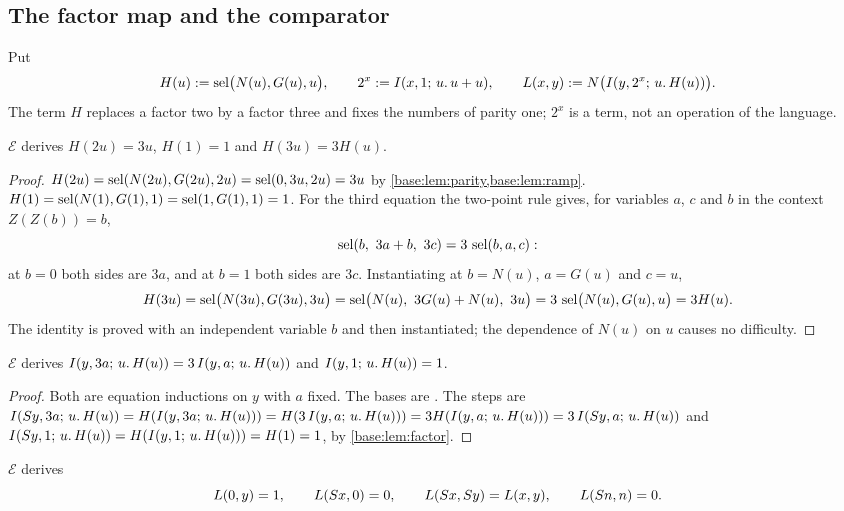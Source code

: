 \subsection{The factor map and the comparator}

Put
\[
 H(u)\mathrel{:=}\operatorname{sel}\bigl(N(u),G(u),u\bigr),\qquad
 2^{x}\mathrel{:=}I(x,1;\,u.\,u+u),\qquad
 L(x,y)\mathrel{:=} N\bigl(I(y,2^{x};\,u.\,H(u))\bigr).
\]
The term $H$ replaces a factor two by a factor three and fixes the numbers
of parity one; $2^x$ is a term, not an operation of the language.

\begin{lemma}
\label{base:lem:factor}
$\mathcal E$ derives $H(2u)=3u$, $H(1)=1$ and $H(3u)=3H(u)$.
\end{lemma}

\begin{proof}
$H(2u)=\operatorname{sel}(N(2u),G(2u),2u)=\operatorname{sel}(0,3u,2u)=3u$ by
\cref{base:lem:parity,base:lem:ramp}.  $H(1)=\operatorname{sel}(N(1),G(1),1)=\operatorname{sel}(1,G(1),1)
=1$.  For the third equation the two-point rule gives, for variables $a$,
$c$ and $b$ in the context $Z(Z(b))=b$,
\[
 \sel(b,\ 3a+b,\ 3c)=3\,\sel(b,a,c):
\]
at $b=0$ both sides are $3a$, and at $b=1$ both sides are $3c$.
Instantiating at $b=N(u)$, $a=G(u)$ and $c=u$,
\[
 H(3u)=\sel\bigl(N(3u),G(3u),3u\bigr)
      =\sel\bigl(N(u),\ 3G(u)+N(u),\ 3u\bigr)=3\,\sel\bigl(N(u),G(u),u\bigr)
      =3H(u).
\]
The identity is proved with an independent variable $b$ and then
instantiated; the dependence of $N(u)$ on $u$ causes no difficulty.
\end{proof}

\begin{lemma}
\label{base:lem:orbit}
$\mathcal E$ derives $I(y,3a;\,u.\,H(u))=3\,I(y,a;\,u.\,H(u))$ and
$I(y,1;\,u.\,H(u))=1$.
\end{lemma}

\begin{proof}
Both are equation inductions on $y$ with $a$ fixed.  The bases are
.  The steps are
$I(S y,3a;\,u.\,H(u))=H(I(y,3a;\,u.\,H(u)))=H(3\,I(y,a;\,u.\,H(u)))
 =3H(I(y,a;\,u.\,H(u)))=3\,I(S y,a;\,u.\,H(u))$ and
$I(S y,1;\,u.\,H(u))=H(I(y,1;\,u.\,H(u)))=H(1)=1$, by
\cref{base:lem:factor}.
\end{proof}

\begin{lemma}[Comparator]
\label{base:lem:cmp}
$\mathcal E$ derives
\[
 L(0,y)=1,\qquad L(S x,0)=0,\qquad L(S x,S y)=L(x,y),\qquad
 L(S n,n)=0 .
\]
\end{lemma}

